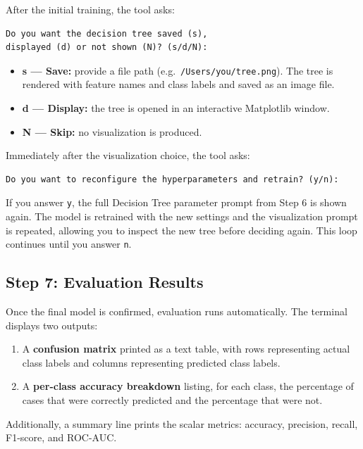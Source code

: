 \documentclass[12pt,a4paper]{article}
\begin{document}
After the initial training, the tool asks:
\begin{verbatim}
Do you want the decision tree saved (s),
displayed (d) or not shown (N)? (s/d/N):
\end{verbatim}
\begin{itemize}
    \item \textbf{s --- Save:} provide a file path (e.g.\ \texttt{/Users/you/tree.png}). The tree is rendered with feature names and class labels and saved as an image file.
    \item \textbf{d --- Display:} the tree is opened in an interactive Matplotlib window.
    \item \textbf{N --- Skip:} no visualization is produced.
\end{itemize}

Immediately after the visualization choice, the tool asks:
\begin{verbatim}
Do you want to reconfigure the hyperparameters and retrain? (y/n):
\end{verbatim}

If you answer \texttt{y}, the full Decision Tree parameter prompt from Step 6 is shown again. The model is retrained with the new settings and the visualization prompt is repeated, allowing you to inspect the new tree before deciding again. This loop continues until you answer \texttt{n}.

\subsection{Step 7: Evaluation Results}
Once the final model is confirmed, evaluation runs automatically. The terminal displays two outputs:

\begin{enumerate}
    \item A \textbf{confusion matrix} printed as a text table, with rows representing actual class labels and columns representing predicted class labels.
    \item A \textbf{per-class accuracy breakdown} listing, for each class, the percentage of cases that were correctly predicted and the percentage that were not.
\end{enumerate}

Additionally, a summary line prints the scalar metrics: accuracy, precision, recall, F1-score, and ROC-AUC.

\end{document}
